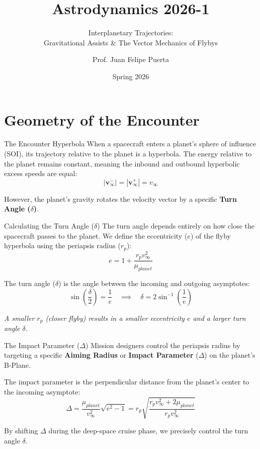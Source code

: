 \documentclass[11pt]{beamer}
\title[Gravitational Assists]{Astrodynamics 2026-1}
\subtitle{Interplanetary Trajectories: \\ Gravitational Assists \& The Vector Mechanics of Flybys}
\author{Prof. Juan Felipe Puerta}
\institute{Universidad de Antioquia - Aerospace Engineering}
\date{Spring 2026}
\begin{document}
\begin{frame}
    \titlepage
\end{frame}

\section{Geometry of the Encounter}

\begin{frame}{The Encounter Hyperbola}
    When a spacecraft enters a planet's sphere of influence (SOI), its trajectory relative to the planet is a hyperbola. The energy relative to the planet remains constant, meaning the inbound and outbound hyperbolic excess speeds are equal:
    \begin{equation}
        |\bm{v}_{\infty}^-| = |\bm{v}_{\infty}^+| = v_\infty
    \end{equation}
    
    However, the planet's gravity rotates the velocity vector by a specific \textbf{Turn Angle ($\delta$)}.
\end{frame}

\begin{frame}{Calculating the Turn Angle ($\delta$)}
    The turn angle depends entirely on how close the spacecraft passes to the planet. We define the eccentricity ($e$) of the flyby hyperbola using the periapsis radius ($r_p$):
    \begin{equation}
        e = 1 + \frac{r_p v_\infty^2}{\mu_{planet}}
    \end{equation}
    
    The turn angle ($\delta$) is the angle between the incoming and outgoing asymptotes:
    \begin{equation}
        \sin\left(\frac{\delta}{2}\right) = \frac{1}{e} \quad \implies \quad \delta = 2 \sin^{-1}\left(\frac{1}{e}\right)
    \end{equation}
    
    \textit{A smaller $r_p$ (closer flyby) results in a smaller eccentricity $e$ and a larger turn angle $\delta$.}
\end{frame}

\begin{frame}{The Impact Parameter ($\Delta$)}
    Mission designers control the periapsis radius by targeting a specific \textbf{Aiming Radius} or \textbf{Impact Parameter} ($\Delta$) on the planet's B-Plane.
    
    The impact parameter is the perpendicular distance from the planet's center to the incoming asymptote:
    \begin{equation}
        \Delta = \frac{\mu_{planet}}{v_\infty^2} \sqrt{e^2 - 1} = r_p \sqrt{\frac{r_p v_\infty^2 + 2\mu_{planet}}{r_p v_\infty^2}}
    \end{equation}
    
    By shifting $\Delta$ during the deep-space cruise phase, we precisely control the turn angle $\delta$.
\end{frame}
\end{document}

